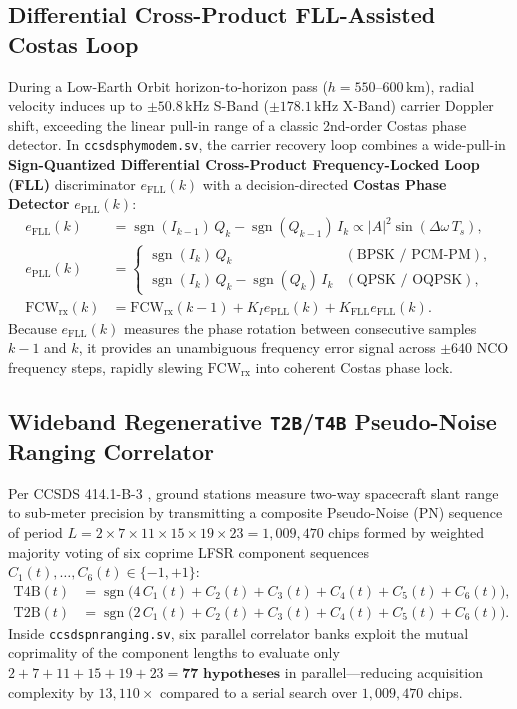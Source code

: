 \documentclass[10pt,a4paper]{article}
\renewcommand{\_}{\origunderscore\penalty0\hskip0pt\relax}
\numberwithin{equation}{section}
\numberwithin{table}{section}
\numberwithin{figure}{section}
\begin{document}
\subsection{Differential Cross-Product FLL-Assisted Costas Loop}
During a Low-Earth Orbit horizon-to-horizon pass ($h = 550\text{--}600\,\text{km}$), radial velocity induces up to $\pm 50.8\,\text{kHz}$ S-Band ($\pm 178.1\,\text{kHz}$ X-Band) carrier Doppler shift, exceeding the linear pull-in range of a classic 2nd-order Costas phase detector. In \texttt{ccsds\_phy\_modem.sv}, the carrier recovery loop combines a wide-pull-in \textbf{Sign-Quantized Differential Cross-Product Frequency-Locked Loop (FLL)} discriminator $e_{\text{FLL}}(k)$ with a decision-directed \textbf{Costas Phase Detector} $e_{\text{PLL}}(k)$:
\begin{align}
  e_{\text{FLL}}(k) &= \operatorname{sgn}(I_{k-1})\,Q_k - \operatorname{sgn}(Q_{k-1})\,I_k \propto |A|^2 \sin(\Delta\omega\, T_s), \\
  e_{\text{PLL}}(k) &= \begin{cases}
    \operatorname{sgn}(I_k)\,Q_k & (\text{BPSK / PCM-PM}), \\
    \operatorname{sgn}(I_k)\,Q_k - \operatorname{sgn}(Q_k)\,I_k & (\text{QPSK / OQPSK}),
  \end{cases} \\
  \text{FCW}_{\text{rx}}(k) &= \text{FCW}_{\text{rx}}(k-1) + K_I e_{\text{PLL}}(k) + K_{\text{FLL}} e_{\text{FLL}}(k).
\end{align}
Because $e_{\text{FLL}}(k)$ measures the phase rotation between consecutive samples $k-1$ and $k$, it provides an unambiguous frequency error signal across $\pm 640$ NCO frequency steps, rapidly slewing $\text{FCW}_{\text{rx}}$ into coherent Costas phase lock.

\subsection{Wideband Regenerative \texttt{T2B}/\texttt{T4B} Pseudo-Noise Ranging Correlator}
Per CCSDS 414.1-B-3 \cite{ccsds414}, ground stations measure two-way spacecraft slant range to sub-meter precision by transmitting a composite Pseudo-Noise (PN) sequence of period $L = 2 \times 7 \times 11 \times 15 \times 19 \times 23 = 1{,}009{,}470$ chips formed by weighted majority voting of six coprime LFSR component sequences $C_1(t), \dots, C_6(t) \in \{-1, +1\}$:
\begin{align}
  \text{T4B}(t) &= \operatorname{sgn}\!\big(4\,C_1(t) + C_2(t) + C_3(t) + C_4(t) + C_5(t) + C_6(t)\big), \\
  \text{T2B}(t) &= \operatorname{sgn}\!\big(2\,C_1(t) + C_2(t) + C_3(t) + C_4(t) + C_5(t) + C_6(t)\big).
\end{align}
Inside \texttt{ccsds\_pn\_ranging.sv}, six parallel correlator banks exploit the mutual coprimality of the component lengths to evaluate only $2 + 7 + 11 + 15 + 19 + 23 = \mathbf{77\text{ hypotheses}}$ in parallel—reducing acquisition complexity by $13{,}110\times$ compared to a serial search over $1{,}009{,}470$ chips.
\end{document}
